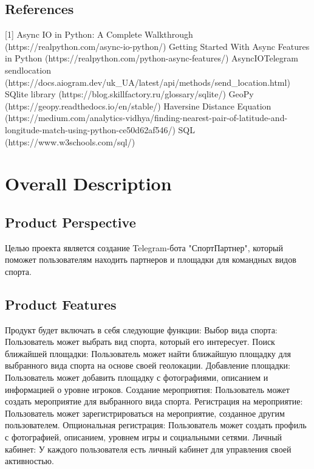 \documentclass{scrreprt}
\begin{document}
\section{References}

[1] Async IO in Python: A Complete Walkthrough
(https://realpython.com/async-io-python/)
\newline
[2] Getting Started With Async Features in Python
(https://realpython.com/python-async-features/)
\newline
[3] AsyncIOTelegram sendlocation (https://docs.aiogram.dev/uk_UA/latest/api/methods/send_location.html)
\newline
[4] SQlite library
(https://blog.skillfactory.ru/glossary/sqlite/)
\newline
[5]  GeoPy
(https://geopy.readthedocs.io/en/stable/)
\newline
[6] Haversine Distance Equation
(https://medium.com/analytics-vidhya/finding-nearest-pair-of-latitude-and-longitude-match-using-python-ce50d62af546/)
\newline
[7] SQL
(https://www.w3schools.com/sql/)

\chapter{Overall Description}

\section{Product Perspective}
Целью проекта является создание Telegram-бота "СпортПартнер", который поможет пользователям находить партнеров и площадки для командных видов спорта.

\section{Product Features}
Продукт будет включать в себя следующие функции:
\newline
Выбор вида спорта: Пользователь может выбрать вид спорта, который его интересует.
\newline
Поиск ближайшей площадки: Пользователь может найти ближайшую площадку для выбранного вида спорта на основе своей геолокации.
\newline
Добавление площадки: Пользователь может добавить площадку с фотографиями, описанием и информацией о уровне игроков.
\newline
Создание мероприятия: Пользователь может создать мероприятие для выбранного вида спорта.
\newline
Регистрация на мероприятие: Пользователь может зарегистрироваться на мероприятие, созданное другим пользователем.
\newline
Опциональная регистрация: Пользователь может создать профиль с фотографией, описанием, уровнем игры и социальными сетями.
\newline
Личный кабинет: У каждого пользователя есть личный кабинет для управления своей активностью.
\end{document}
